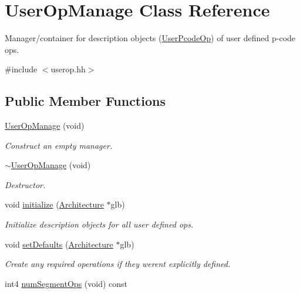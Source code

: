\hypertarget{class_user_op_manage}{}\section{User\+Op\+Manage Class Reference}
\label{class_user_op_manage}


Manager/container for description objects (\mbox{\hyperlink{class_user_pcode_op}{User\+Pcode\+Op}}) of user defined p-\/code ops.  




{\ttfamily \#include $<$userop.\+hh$>$}

\subsection*{Public Member Functions}
\begin{DoxyCompactItemize}
\item 
\mbox{\hyperlink{class_user_op_manage_a098ed23d045ef596ee62529d1966a888}{User\+Op\+Manage}} (void)
\begin{DoxyCompactList}\small\item\em Construct an empty manager. \end{DoxyCompactList}\item 
\mbox{\hyperlink{class_user_op_manage_ac1cf153da5ddb19471541660c8889b8f}{$\sim$\+User\+Op\+Manage}} (void)
\begin{DoxyCompactList}\small\item\em Destructor. \end{DoxyCompactList}\item 
void \mbox{\hyperlink{class_user_op_manage_a3a4220cee8c82eb2a30b527bb952a4d6}{initialize}} (\mbox{\hyperlink{class_architecture}{Architecture}} $\ast$glb)
\begin{DoxyCompactList}\small\item\em Initialize description objects for all user defined ops. \end{DoxyCompactList}\item 
void \mbox{\hyperlink{class_user_op_manage_ac1fd9f8f2ee822b082ef0a3b1bcae120}{set\+Defaults}} (\mbox{\hyperlink{class_architecture}{Architecture}} $\ast$glb)
\begin{DoxyCompactList}\small\item\em Create any required operations if they weren\textquotesingle{}t explicitly defined. \end{DoxyCompactList}\item 
int4 \mbox{\hyperlink{class_user_op_manage_abe119d872d491a6ce772c19fc15ace18}{num\+Segment\+Ops}} (void) const

\end{DoxyCompactItemize}
